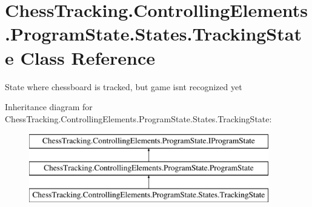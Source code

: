 \hypertarget{class_chess_tracking_1_1_controlling_elements_1_1_program_state_1_1_states_1_1_tracking_state}{}\section{Chess\+Tracking.\+Controlling\+Elements.\+Program\+State.\+States.\+Tracking\+State Class Reference}
\label{class_chess_tracking_1_1_controlling_elements_1_1_program_state_1_1_states_1_1_tracking_state}


State where chessboard is tracked, but game isn\textquotesingle{}t recognized yet  


Inheritance diagram for Chess\+Tracking.\+Controlling\+Elements.\+Program\+State.\+States.\+Tracking\+State\+:\begin{figure}[H]
\begin{center}
\leavevmode
\includegraphics[height=3.000000cm]{class_chess_tracking_1_1_controlling_elements_1_1_program_state_1_1_states_1_1_tracking_state}
\end{center}
\end{figure}
